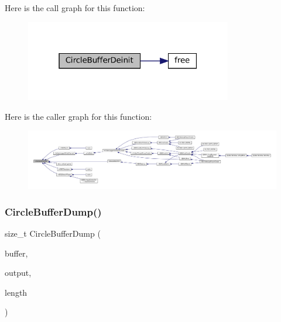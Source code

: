 Here is the call graph for this function\+:
\nopagebreak
\begin{figure}[H]
\begin{center}
\leavevmode
\includegraphics[width=256pt]{circle-buffer_8c_ace75de8785dd1b075cab547bf6f81563_cgraph}
\end{center}
\end{figure}
Here is the caller graph for this function\+:
\nopagebreak
\begin{figure}[H]
\begin{center}
\leavevmode
\includegraphics[width=350pt]{circle-buffer_8c_ace75de8785dd1b075cab547bf6f81563_icgraph}
\end{center}
\end{figure}
\mbox{\label{circle-buffer_8c_a13bf863d3a10d3b22cffbe60c1706c33}} 
\subsubsection{\texorpdfstring{Circle\+Buffer\+Dump()}{CircleBufferDump()}}
{\footnotesize\ttfamily size\+\_\+t Circle\+Buffer\+Dump (\begin{DoxyParamCaption}\item[{const struct Circle\+Buffer $\ast$}]{buffer,  }\item[{void $\ast$}]{output,  }\item[{size\+\_\+t}]{length }\end{DoxyParamCaption})}

